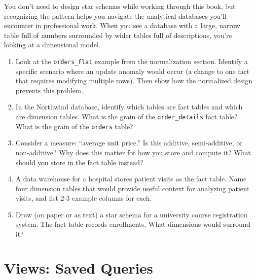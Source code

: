 \documentclass[
  letterpaper,
  DIV=11,
  numbers=noendperiod]{scrreprt}
\begin{document}
You don't need to design star schemas while working through this book,
but recognizing the pattern helps you navigate the analytical databases
you'll encounter in professional work. When you see a database with a
large, narrow table full of numbers surrounded by wider tables full of
descriptions, you're looking at a dimensional model.

\begin{tcolorbox}[enhanced jigsaw, opacitybacktitle=0.6, arc=.35mm, colback=white, bottomtitle=1mm, opacityback=0, toprule=.15mm, left=2mm, colbacktitle=quarto-callout-note-color!10!white, breakable, coltitle=black, toptitle=1mm, colframe=quarto-callout-note-color-frame, bottomrule=.15mm, titlerule=0mm, title=\textcolor{quarto-callout-note-color}{\faInfo}\hspace{0.5em}{Exercises}, rightrule=.15mm, leftrule=.75mm]

\begin{enumerate}
\def\labelenumi{\arabic{enumi}.}
\item
  Look at the \texttt{orders\_flat} example from the normalization
  section. Identify a specific scenario where an update anomaly would
  occur (a change to one fact that requires modifying multiple rows).
  Then show how the normalized design prevents this problem.
\item
  In the Northwind database, identify which tables are fact tables and
  which are dimension tables. What is the grain of the
  \texttt{order\_details} fact table? What is the grain of the
  \texttt{orders} table?
\item
  Consider a measure: ``average unit price.'' Is this additive,
  semi-additive, or non-additive? Why does this matter for how you store
  and compute it? What should you store in the fact table instead?
\item
  A data warehouse for a hospital stores patient visits as the fact
  table. Name four dimension tables that would provide useful context
  for analyzing patient visits, and list 2-3 example columns for each.
\item
  Draw (on paper or as text) a star schema for a university course
  registration system. The fact table records enrollments. What
  dimensions would surround it?
\end{enumerate}

\end{tcolorbox}

\section{Views: Saved Queries}\label{views-saved-queries}
\end{document}
